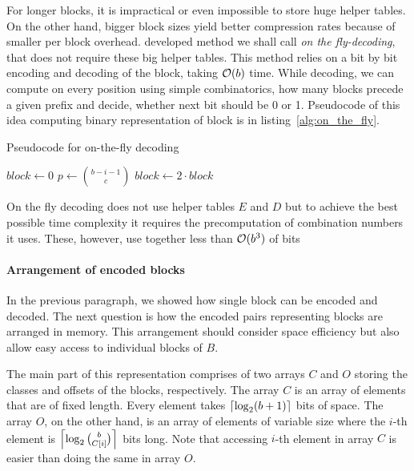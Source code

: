 For longer blocks, it is impractical or even impossible to store huge helper tables. On the other
hand, bigger block sizes yield better compression rates because of smaller per block overhead. \cite{navarro2012fast}
developed method we shall call \textit{on the fly-decoding}, that does not require these big helper tables. 
This method relies on a bit by bit encoding and decoding of the block, taking $\mathcal{O}(b)$ time. While decoding,
we can compute on every position using simple combinatorics, how many blocks precede a given prefix and decide,
whether next bit should be 0 or 1. Pseudocode of this idea computing binary representation of block is in
listing~\ref{alg:on_the_fly}.

\begin{algorithm}
\caption{Pseudocode for on-the-fly decoding}\label{alg:on_the_fly}
    $block \gets 0$\;
     {
        $p \gets {b-i-1\choose c}$\;
         {
            $block \gets 2\cdot block$\;
        } 
    }
\end{algorithm}

On the fly decoding does not use helper tables $E$ and $D$ but to achieve the best possible time complexity
it requires the precomputation of combination numbers it uses. These, however, use together less than $\mathcal{O}(b^3)$
of bits

\paragraph{Arrangement of encoded blocks}

In the previous paragraph, we showed how single block can be encoded and decoded. The next question is how the
encoded pairs representing blocks are arranged in memory. This arrangement should consider space efficiency
but also allow easy access to individual blocks of $B$. 

The main part of this representation comprises of two arrays $C$ and $O$ storing the classes and offsets of
the blocks, respectively. The array $C$ is an array of elements that are of fixed length. Every element takes
$\left\lceil \log_2(b+1) \right\rceil$ bits of space. The array $O$, on the other hand, is an array of elements of variable
size where the $i$-th element is $\left\lceil \log_2{b\choose C[i]} \right\rceil$ bits long. Note that accessing $i$-th element
in array $C$ is easier than doing the same in array $O$.

